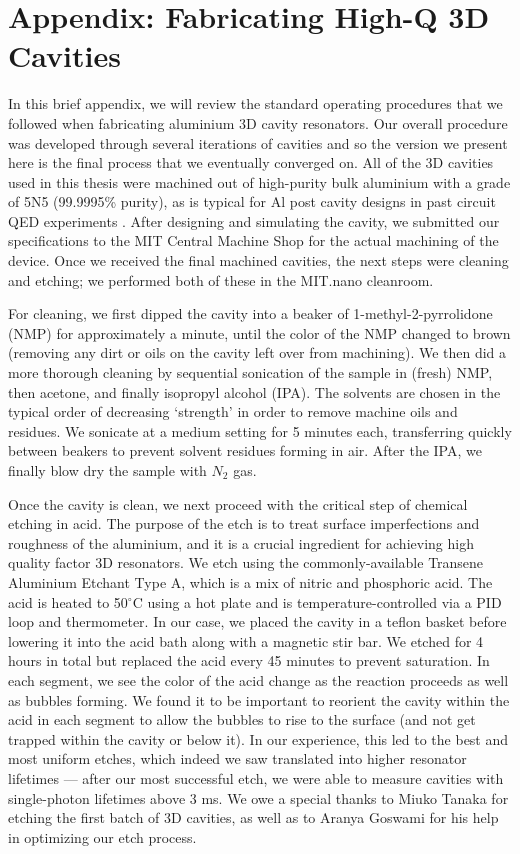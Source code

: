 \chapter{Appendix: Fabricating High-Q 3D Cavities \label{ch:AppB}}

In this brief appendix, we will review the standard operating procedures that we followed when fabricating aluminium 3D cavity resonators. Our overall procedure was developed through several iterations of cavities and so the version we present here is the final process that we eventually converged on. All of the 3D cavities used in this thesis were machined out of high-purity bulk aluminium with a grade of 5N5 (99.9995\% purity), as is typical for Al post cavity designs in past circuit QED experiments \cite{reagor2013reaching}. After designing and simulating the cavity, we submitted our specifications to the MIT Central Machine Shop for the actual machining of the device. Once we received the final machined cavities, the next steps were cleaning and etching; we performed both of these in the MIT.nano cleanroom.

For cleaning, we first dipped the cavity into a beaker of 1-methyl-2-pyrrolidone (NMP) for approximately a minute, until the color of the NMP changed to brown (removing any dirt or oils on the cavity left over from machining). We then did a more thorough cleaning by sequential sonication of the sample in (fresh) NMP, then acetone, and finally isopropyl alcohol (IPA). The solvents are chosen in the typical order of decreasing `strength' in order to remove machine oils and residues. We sonicate at a medium setting for 5 minutes each, transferring quickly between beakers to prevent solvent residues forming in air. After the IPA, we finally blow dry the sample with $N_2$ gas. 

Once the cavity is clean, we next proceed with the critical step of chemical etching in acid. The purpose of the etch is to treat surface imperfections and roughness of the aluminium, and it is a crucial ingredient for achieving high quality factor 3D resonators. We etch using the commonly-available Transene Aluminium Etchant Type A, which is a mix of nitric and phosphoric acid. The acid is heated to 50$^\circ$C using a hot plate and is temperature-controlled via a PID loop and thermometer. In our case, we placed the cavity in a teflon basket before lowering it into the acid bath along with a magnetic stir bar. We etched for 4 hours in total but replaced the acid every 45 minutes to prevent saturation. In each segment, we see the color of the acid change as the reaction proceeds as well as bubbles forming. We found it to be important to reorient the cavity within the acid in each segment to allow the bubbles to rise to the surface (and not get trapped within the cavity or below it). In our experience, this led to the best and most uniform etches, which indeed we saw translated into higher resonator lifetimes ---  after our most successful etch, we were able to measure cavities with single-photon lifetimes above 3 ms. We owe a special thanks to Miuko Tanaka for etching the first batch of 3D cavities, as well as to Aranya Goswami for his help in optimizing our etch process.

